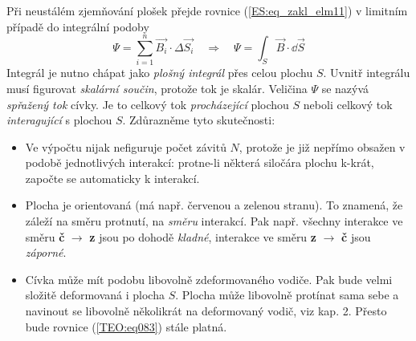         Při neustálém zjemňování plošek přejde rovnice (\ref{ES:eq_zakl_elm11}) v limitním případě 
        do integrální podoby
        \begin{equation}\label{TEO:eq083}
          \Psi = \sum_{i=1}^n\vec{B_i}\cdot\Delta\vec{S_i} \quad\Longrightarrow\quad
          \Psi = \int_S\vec{B}\cdot \dd{\vec{S}}
        \end{equation}
        Integrál je nutno chápat jako \emph{plošný integrál} přes celou plochu \(S\). Uvnitř 
        integrálu musí figurovat \emph{skalární součin}, protože tok je skalár. Veličina \(\Psi\) 
        se nazývá \emph{spřažený tok} cívky. Je to celkový tok \emph{procházející} plochou \(S\) 
        neboli celkový tok \emph{interagující} s plochou \(S\). Zdůrazněme tyto skutečnosti:
        \begin{itemize}[noitemsep]
          \item Ve výpočtu nijak nefiguruje počet závitů \(N\), protože je již nepřímo obsažen v 
                podobě jednotlivých interakcí: protne-li některá siločára plochu k-krát, započte se 
                automaticky k interakcí.
        
          \item Plocha je orientovaná (má např. červenou a zelenou stranu). To znamená, že záleží 
                na směru protnutí, na \emph{směru} interakcí. Pak např. všechny interakce ve směru 
                \textbf{č} \(\rightarrow\) \textbf{z} jsou po dohodě \emph{kladné}, interakce 
                ve směru \textbf{z} \(\rightarrow\) \textbf{č} jsou \emph{záporné}.
        
          \item Cívka může mít podobu libovolně zdeformovaného vodiče. Pak bude velmi složitě 
                deformovaná i plocha \(S\). Plocha může libovolně protínat sama sebe a navinout se 
                libovolně několikrát na deformovaný vodič, viz kap. 2. Přesto bude rovnice 
                (\ref{TEO:eq083}) stále platná.
      \end{itemize}
      
